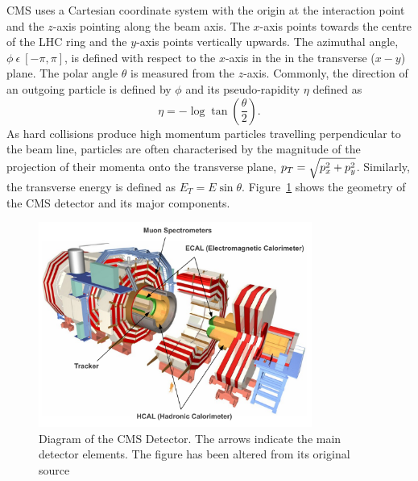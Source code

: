 CMS uses a Cartesian coordinate system with the origin at the 
interaction point and the $z$-axis pointing along the beam axis. The $x$-axis points towards 
the centre of the LHC ring and the $y$-axis points vertically upwards. The azimuthal angle, 
$\phi~\epsilon~[-\pi,\pi]$, is defined with respect to the $x$-axis in the in the 
transverse ($x-y$) plane. The polar angle $\theta$ is measured from the $z$-axis. Commonly,
the direction of an outgoing particle is defined by $\phi$ and its pseudo-rapidity $\eta$ 
defined as 
\begin{equation}
	\eta=-\log \tan \left( \frac{\theta}{2} \right).
\end{equation}
As hard collisions produce high momentum particles travelling perpendicular to the beam line, 
particles are often characterised
by the magnitude of the projection of their momenta onto the transverse plane, 
$p_{T}=\sqrt{p_{x}^{2}+p_{y}^{2}}$.
Similarly, the transverse energy is defined as $E_{T}=E\sin\theta$.
Figure~\ref{fig:cms} shows the geometry of the CMS detector and its major components. 

\begin{figure}
\centering
	\includegraphics[width=0.8\textwidth]{detector/cmsdetector}
	\caption{Diagram of the CMS Detector. The arrows indicate the main detector elements. 
	The figure has been altered from its original source~\citep{cmspub}}
	\label{fig:cms}
\end{figure}

